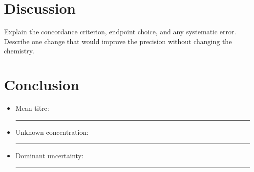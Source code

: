 \documentclass[11pt]{article}
\begin{document}
\section{Discussion}
Explain the concordance criterion, endpoint choice, and any systematic error.
Describe one change that would improve the precision without changing the
chemistry.

\section{Conclusion}
\begin{itemize}[leftmargin=*]
\item Mean titre: \rule{0.35\linewidth}{0.4pt}
\item Unknown concentration: \rule{0.35\linewidth}{0.4pt}
\item Dominant uncertainty: \rule{0.35\linewidth}{0.4pt}
\end{itemize}
\end{document}

